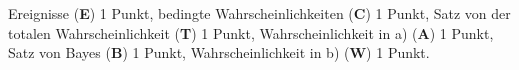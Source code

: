 \begin{bewertung}
Ereignisse ({\bf E}) 1 Punkt,
bedingte Wahrscheinlichkeiten ({\bf C}) 1 Punkt,
Satz von der totalen Wahrscheinlichkeit ({\bf T}) 1 Punkt,
Wahrscheinlichkeit in a) ({\bf A}) 1 Punkt,
Satz von Bayes ({\bf B}) 1 Punkt,
Wahrscheinlichkeit in b) ({\bf W}) 1 Punkt.
\end{bewertung}

